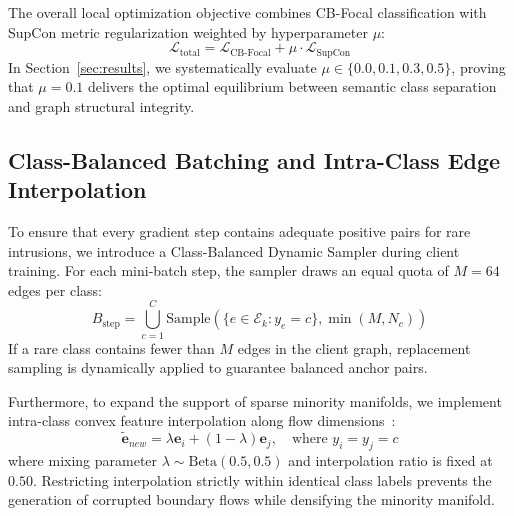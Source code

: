 \documentclass[journal,onecolumn]{IEEEtran}
\begin{document}
The overall local optimization objective combines CB-Focal classification with SupCon metric regularization weighted by hyperparameter $\mu$:
\begin{equation}
\mathcal{L}_{\text{total}} = \mathcal{L}_{\text{CB-Focal}} + \mu \cdot \mathcal{L}_{\text{SupCon}}
\label{eq:total_objective}
\end{equation}
In Section~\ref{sec:results}, we systematically evaluate $\mu \in \{0.0, 0.1, 0.3, 0.5\}$, proving that $\mu = 0.1$ delivers the optimal equilibrium between semantic class separation and graph structural integrity.

\subsection{Class-Balanced Batching and Intra-Class Edge Interpolation}
To ensure that every gradient step contains adequate positive pairs for rare intrusions, we introduce a Class-Balanced Dynamic Sampler during client training. For each mini-batch step, the sampler draws an equal quota of $M = 64$ edges per class:
\begin{equation}
B_{\text{step}} = \bigcup_{c=1}^C \text{Sample}\left(\{e \in \mathcal{E}_k : y_e = c\}, \min(M, N_c)\right)
\label{eq:balanced_sampler}
\end{equation}
If a rare class contains fewer than $M$ edges in the client graph, replacement sampling is dynamically applied to guarantee balanced anchor pairs.

Furthermore, to expand the support of sparse minority manifolds, we implement intra-class convex feature interpolation along flow dimensions~\cite{zhang2018mixup}:
\begin{equation}
\tilde{\boldsymbol{e}}_{new} = \lambda \boldsymbol{e}_i + (1 - \lambda) \boldsymbol{e}_j, \quad \text{where } y_i = y_j = c
\label{eq:edge_interpolation}
\end{equation}
where mixing parameter $\lambda \sim \text{Beta}(0.5, 0.5)$ and interpolation ratio is fixed at $0.50$. Restricting interpolation strictly within identical class labels prevents the generation of corrupted boundary flows while densifying the minority manifold.
\end{document}
